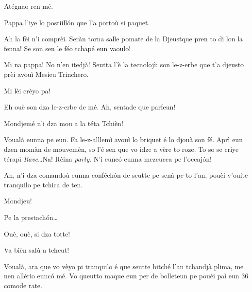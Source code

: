 \begin{drama}
\Cienspeaks Atégnao ren mé.


\Simonspeaks Pappa l’iye lo postiill\'on que l’a portoù si paquet.

\Cienspeaks Ah la fèi n'i comprèi. Seràn torna salle pomate de la \og Djeust\fg que pren to di lon la fenna! Se son sen le féo tchapé eun vaoulo!

\Simonspeaks Mi na pappa! No n'en itedjà! Seutta l'è la tecnolojì: son le-z-erbe que t’a djeusto prèi avouì Mesieu Trinchero.

\Cienspeaks Mi lèi crèyo pa!


\Trincherospeaks Eh ouè son dza le-z-erbe de mé. Ah, sentade que parfeun!


\Mariettospeaks Mondjemé n’i dza mou a la téta Tchièn!


\Trincherospeaks Voualà eunna pe eun. Fa le-z-alllemì avouì lo briquet é lo djouà son fé. Aprì eun dzen momàn de mouvemèn, so l’é sen que vo idze a vère to roze. To so se criye térapì \textit{Rave}\ldots Na! Rèina \textit{party}. N’i eunc\'o eunna mezeucca pe l’occaj\'on!




\Trincherospeaks Ah, n’i dza comandoù eunna conféch\'on de seutte pe senà pe to l’an, pouèi v'ouite tranquilo pe tchica de ten. 

\Cienspeaks Mondjeu!

\Trincherospeaks Pe la prestach\'on\ldots

\Cienspeaks Ouè, ouè, si dza totte!

\Trincherospeaks Va bièn salù a tcheut!


\Chefspeaks Voualà, ara que vo vèyo pi tranquilo é  que seutte bitché l’an tchandjà plima, me nen allério eunc\'o mé. Vo queutto maque eun per de  bolleteun pe pouèi paì eun 36 comode rate.


\end{drama}
